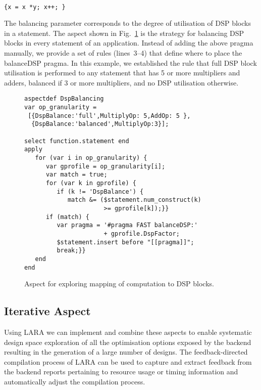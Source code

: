 \noindent\texttt{\footnotesize{} \\
\{x = x *y; x++; \}}

\vspace{2mm} The balancing parameter corresponds to the degree of
utilisation of DSP blocks in a statement.  The aspect shown in
Fig.~\ref{fig:aspect-DSP} is the strategy for balancing DSP blocks in
every statement of an application. Instead of adding the above pragma
manually, we provide a set of rules (lines~3--4) that define where to
place the balanceDSP pragma. In this example, we established the rule
that full DSP block utilisation is performed to any statement that has
5 or more multipliers and adders, balanced if 3 or more multipliers,
and no DSP utilisation otherwise.

\lstset{style=lara}
\begin{figure}[!h]
  \centering
  \begin{lstlisting}
aspectdef DspBalancing
var op_granularity =
 [{DspBalance:'full',MultiplyOp: 5,AddOp: 5 },
  {DspBalance:'balanced',MultiplyOp:3}];

select function.statement end
apply
   for (var i in op_granularity) {
      var gprofile = op_granularity[i];
      var match = true;
      for (var k in gprofile) {
         if (k != 'DspBalance') {
            match &= ($statement.num_construct(k)
                      >= gprofile[k]);}}
      if (match) {
         var pragma = '#pragma FAST balanceDSP:'
                      + gprofile.DspFactor;
         $statement.insert before "[[pragma]]";
         break;}}
   end
end
  \end{lstlisting}
  \caption{Aspect for exploring mapping of computation to DSP blocks.}
  \label{fig:aspect-DSP}
\vspace{-3mm}
\end{figure}

\subsection{Iterative Aspect}
\label{sect:asp_it}
Using LARA we can implement and combine these aspects to enable
systematic design space exploration of all the optimisation options
exposed by the \MAXC{} backend resulting in the generation of a large
number of designs. The feedback-directed compilation process of LARA
can be used to capture and extract feedback from the backend reports
pertaining to resource usage or timing information and automatically
adjust the compilation process.

